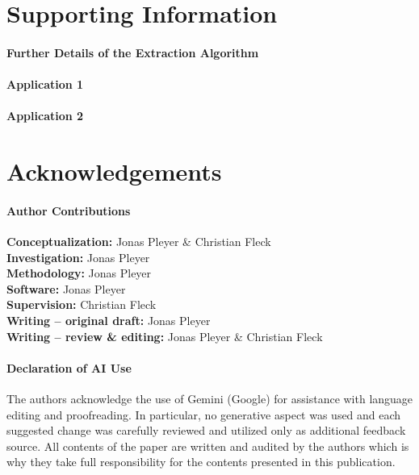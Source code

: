 \documentclass[10pt,letterpaper]{article}
\begin{document}
\section*{Supporting Information}
\paragraph*{Further Details of the Extraction Algorithm}
\label{sec:supplement-extraction-algorithm}


\newpage
\paragraph*{Application 1}
\label{sec:supplement-amir-details}


\newpage
\paragraph*{Application 2}
\label{sec:supplement-data-details}


\newpage
\section*{Acknowledgements}
\paragraph{Author Contributions}
\textbf{Conceptualization:} Jonas Pleyer \& Christian Fleck\\
\textbf{Investigation:} Jonas Pleyer\\
\textbf{Methodology:} Jonas Pleyer\\
\textbf{Software:} Jonas Pleyer\\
\textbf{Supervision:} Christian Fleck\\
\textbf{Writing – original draft:} Jonas Pleyer\\
\textbf{Writing – review \& editing:} Jonas Pleyer \& Christian Fleck

\paragraph*{Declaration of AI Use}
The authors acknowledge the use of Gemini (Google) for assistance with language editing and
proofreading.
In particular, no generative aspect was used and each suggested change was carefully reviewed and
utilized only as additional feedback source.
All contents of the paper are written and audited by the authors which is why they take full
responsibility for the contents presented in this publication.
\end{document}
